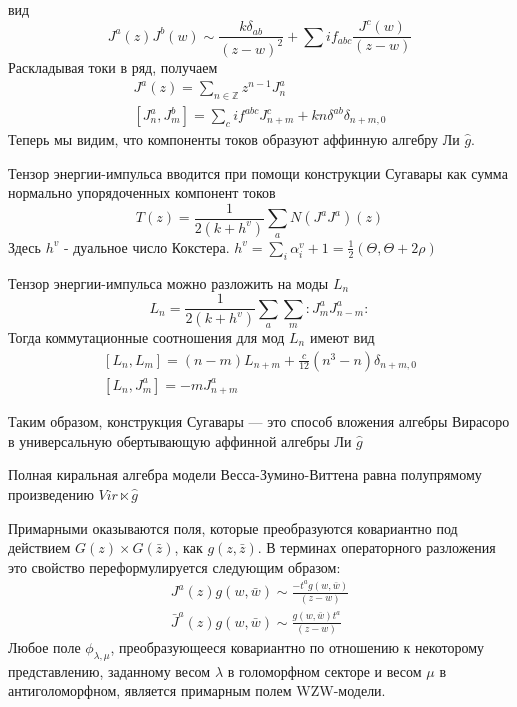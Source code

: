 \documentclass[a4paper,12pt]{article}
\theoremstyle{definition} \newtheorem{Def}{Definition}
\begin{document}
вид 
\begin{equation}
  \label{eq:89}
  J^a(z) J^b(w) \sim \frac{k\delta_{ab}}{(z-w)^2}+\sum i f_{abc}\frac{J^c(w)}{(z-w)}
\end{equation}
Раскладывая токи в ряд, получаем
\begin{equation}
  \label{eq:90}
  \begin{aligned}
    J^a(z)=\sum_{n\in \mathbb Z}z^{n-1}J^a_n\\
    \left[J^a_n,J^b_m\right]=\sum_c i f^{abc}J^c_{n+m}+kn\delta^{ab}\delta_{n+m,0}
  \end{aligned}
\end{equation}
Теперь мы видим, что компоненты токов образуют аффинную алгебру Ли $\hat g$.


Тензор энергии-импульса вводится при помощи конструкции Сугавары как сумма нормально упорядоченных компонент токов
\begin{equation}
  \label{eq:102}
  T(z)=\frac{1}{2(k+h^v)}\sum_a N(J^a J^a)(z)
\end{equation}
Здесь $h^v$ - дуальное число Кокстера. $h^v=\sum_i \alpha_i^v +1=\frac{1}{2}(\Theta,\Theta+2\rho)$

Тензор энергии-импульса можно разложить на моды $L_n$
\begin{equation}
  \label{eq:91}
  L_n=\frac{1}{2(k+h^v)}\sum_a\sum_m:J^a_m J^a_{n-m}:
\end{equation}
Тогда коммутационные соотношения для мод $L_n$ имеют вид
\begin{equation}
  \label{eq:92}
  \begin{aligned}
    \left[L_n,L_m\right]=(n-m)L_{n+m}+\frac{c}{12}(n^3-n)\delta_{n+m,0}\\
    \left[L_n,J^a_m\right]=-mJ^a_{n+m}
  \end{aligned}
\end{equation}

Таким образом, конструкция Сугавары --- это способ вложения алгебры Вирасоро в универсальную обертывающую аффинной алгебры Ли $\hat{g}$

Полная киральная алгебра модели Весса-Зумино-Виттена равна полупрямому произведению $Vir\ltimes \hat g$

Примарными оказываются поля, которые преобразуются ковариантно под действием $G(z)\times G(\bar z)$,
как $g(z,\bar z)$. В терминах операторного разложения это свойство переформулируется следующим
образом:
\begin{equation}
  \label{eq:84}
  \begin{aligned}
    J^a(z)g(w,\bar w)\sim \frac{-t^a g(w,\bar w)}{(z-w)}\\
    \bar J^a(z)g(w,\bar w)\sim \frac{ g(w,\bar w)t^a}{(z-w)}
  \end{aligned}
\end{equation}
Любое поле $\phi_{\lambda,\mu}$, преобразующееся ковариантно по отношению к некоторому
представлению, заданному весом $\lambda$ в голоморфном секторе и весом $\mu$ в антиголоморфном,
является примарным полем WZW-модели.
\end{document}
